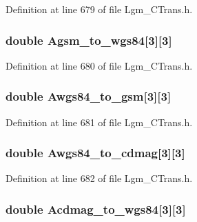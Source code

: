 Definition at line 679 of file Lgm\_\-CTrans.h.\hypertarget{struct_lgm___c_trans_6322719ffe580e8f5b206972478e1c41}{
\subsubsection[{Agsm\_\-to\_\-wgs84}]{\setlength{\rightskip}{0pt plus 5cm}double {\bf Agsm\_\-to\_\-wgs84}\mbox{[}3\mbox{]}\mbox{[}3\mbox{]}}}
\label{struct_lgm___c_trans_6322719ffe580e8f5b206972478e1c41}




Definition at line 680 of file Lgm\_\-CTrans.h.\hypertarget{struct_lgm___c_trans_88eb2b4dca5ab35213cadf57cf09de4c}{
\subsubsection[{Awgs84\_\-to\_\-gsm}]{\setlength{\rightskip}{0pt plus 5cm}double {\bf Awgs84\_\-to\_\-gsm}\mbox{[}3\mbox{]}\mbox{[}3\mbox{]}}}
\label{struct_lgm___c_trans_88eb2b4dca5ab35213cadf57cf09de4c}




Definition at line 681 of file Lgm\_\-CTrans.h.\hypertarget{struct_lgm___c_trans_3c3703af84212fe400ea4de85746f86c}{
\subsubsection[{Awgs84\_\-to\_\-cdmag}]{\setlength{\rightskip}{0pt plus 5cm}double {\bf Awgs84\_\-to\_\-cdmag}\mbox{[}3\mbox{]}\mbox{[}3\mbox{]}}}
\label{struct_lgm___c_trans_3c3703af84212fe400ea4de85746f86c}




Definition at line 682 of file Lgm\_\-CTrans.h.\hypertarget{struct_lgm___c_trans_1f66bf8da027bcc6ac0535710e14027f}{
\subsubsection[{Acdmag\_\-to\_\-wgs84}]{\setlength{\rightskip}{0pt plus 5cm}double {\bf Acdmag\_\-to\_\-wgs84}\mbox{[}3\mbox{]}\mbox{[}3\mbox{]}}}
\label{struct_lgm___c_trans_1f66bf8da027bcc6ac0535710e14027f}




